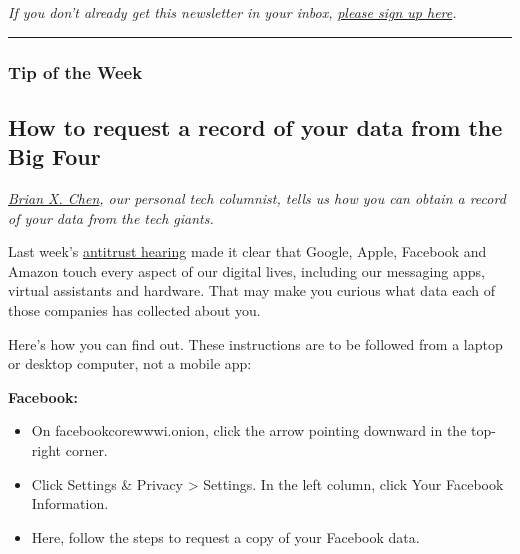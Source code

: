 \emph{If you don't already get this newsletter in your inbox,}
\href{https://www.nytimes3xbfgragh.onion/newsletters/signup/OT}{\emph{please
sign up here}}\emph{.}

\begin{center}\rule{0.5\linewidth}{\linethickness}\end{center}

\hypertarget{tip-of-the-week}{%
\subsubsection{Tip of the Week}\label{tip-of-the-week}}

\hypertarget{how-to-request-a-record-of-your-data-from-the-big-four}{%
\subsection{How to request a record of your data from the Big
Four}\label{how-to-request-a-record-of-your-data-from-the-big-four}}

\href{https://www.nytimes3xbfgragh.onion/by/brian-x-chen}{\emph{Brian X.
Chen}}\emph{, our personal tech columnist, tells us how you can obtain a
record of your data from the tech giants.}

Last week's
\href{https://www.nytimes3xbfgragh.onion/2020/07/29/technology/big-tech-hearing-apple-amazon-facebook-google.html}{antitrust
hearing} made it clear that Google, Apple, Facebook and Amazon touch
every aspect of our digital lives, including our messaging apps, virtual
assistants and hardware. That may make you curious what data each of
those companies has collected about you.

Here's how you can find out. These instructions are to be followed from
a laptop or desktop computer, not a mobile app:

\textbf{Facebook:}

\begin{itemize}
\tightlist
\item
  On facebookcorewwwi.onion, click the arrow pointing downward in the
  top-right corner.
\end{itemize}

\begin{itemize}
\tightlist
\item
  Click Settings \& Privacy \textgreater{} Settings. In the left column,
  click Your Facebook Information.
\end{itemize}

\begin{itemize}
\tightlist
\item
  Here, follow the steps to request a copy of your Facebook data.
\end{itemize}

